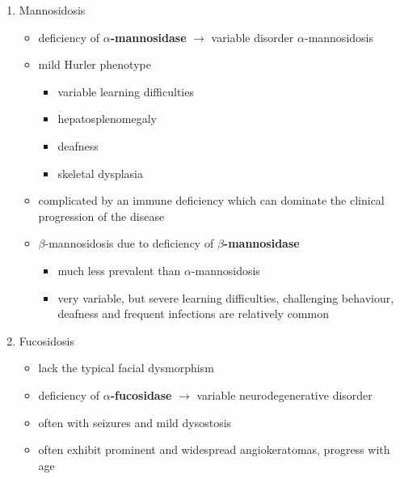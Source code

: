 \documentclass[12pt]{scrartcl}
\begin{document}
\begin{enumerate}
\item Mannosidosis
\label{sec:org2f3073d}
\begin{itemize}
\item deficiency of \textbf{\(\alpha\)-mannosidase} \(\to\) variable disorder \(\alpha\)-mannosidosis
\item mild Hurler phenotype
\begin{itemize}
\item variable learning difficulties
\item hepatosplenomegaly
\item deafness
\item skeletal dysplasia
\end{itemize}
\item complicated by an immune deficiency which can dominate the clinical
progression of the disease

\item \(\beta\)-mannosidosis due to deficiency of \textbf{\(\beta\)-mannosidase}
\begin{itemize}
\item much less prevalent than \(\alpha\)-mannosidosis
\item very variable, but severe learning difficulties, challenging
behaviour, deafness and frequent infections are relatively common
\end{itemize}
\end{itemize}

\item Fucosidosis
\label{sec:org14fcf7b}
\begin{itemize}
\item lack the typical facial dysmorphism
\item deficiency of \textbf{\(\alpha\)-fucosidase} \(\to\) variable neurodegenerative disorder
\item often with seizures and mild dysostosis
\item often exhibit prominent and widespread angiokeratomas, progress with age
\end{itemize}


\end{enumerate}
\end{document}
